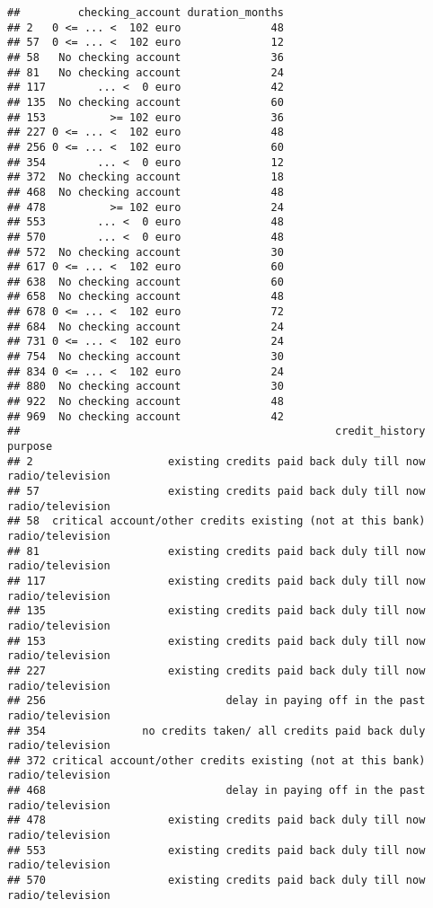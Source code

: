 \documentclass[
]{article}
\begin{document}
\begin{verbatim}
##         checking_account duration_months
## 2   0 <= ... <  102 euro              48
## 57  0 <= ... <  102 euro              12
## 58   No checking account              36
## 81   No checking account              24
## 117        ... <  0 euro              42
## 135  No checking account              60
## 153          >= 102 euro              36
## 227 0 <= ... <  102 euro              48
## 256 0 <= ... <  102 euro              60
## 354        ... <  0 euro              12
## 372  No checking account              18
## 468  No checking account              48
## 478          >= 102 euro              24
## 553        ... <  0 euro              48
## 570        ... <  0 euro              48
## 572  No checking account              30
## 617 0 <= ... <  102 euro              60
## 638  No checking account              60
## 658  No checking account              48
## 678 0 <= ... <  102 euro              72
## 684  No checking account              24
## 731 0 <= ... <  102 euro              24
## 754  No checking account              30
## 834 0 <= ... <  102 euro              24
## 880  No checking account              30
## 922  No checking account              48
## 969  No checking account              42
##                                                 credit_history          purpose
## 2                     existing credits paid back duly till now radio/television
## 57                    existing credits paid back duly till now radio/television
## 58  critical account/other credits existing (not at this bank) radio/television
## 81                    existing credits paid back duly till now radio/television
## 117                   existing credits paid back duly till now radio/television
## 135                   existing credits paid back duly till now radio/television
## 153                   existing credits paid back duly till now radio/television
## 227                   existing credits paid back duly till now radio/television
## 256                            delay in paying off in the past radio/television
## 354               no credits taken/ all credits paid back duly radio/television
## 372 critical account/other credits existing (not at this bank) radio/television
## 468                            delay in paying off in the past radio/television
## 478                   existing credits paid back duly till now radio/television
## 553                   existing credits paid back duly till now radio/television
## 570                   existing credits paid back duly till now radio/television

\end{verbatim}
\end{document}
